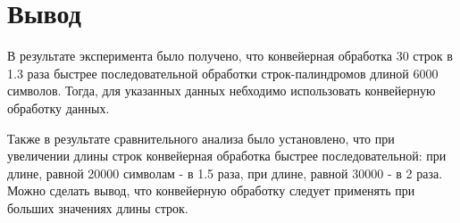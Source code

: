 \section{Вывод}

В результате эксперимента было получено, что конвейерная обработка 30 строк в 1.3 раза быстрее последовательной обработки строк-палиндромов длиной 6000 символов. Тогда, для указанных данных небходимо использовать конвейерную обработку данных.

Также в результате сравнительного анализа было установлено, что при увеличении длины строк конвейерная обработка быстрее последовательной: при длине, равной 20000 символам - в 1.5 раза, при длине, равной 30000 - в 2 раза. Можно сделать вывод, что конвейерную обработку следует применять при больших значениях длины строк.